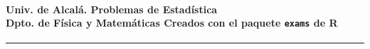 \documentclass[10pt,a4paper]{article}
\begin{document}
\thispagestyle{empty}

\paragraph{Univ. de Alcalá. \hspace{5cm}Problemas de Estadística\\[2mm]
{Dpto. de Física y Matemáticas}\hspace{1cm} Creados con el paquete {\tt exams} de R}
\noindent\hrule

\vspace{0.5cm}


\begin{enumerate}


\end{enumerate}
\end{document}
